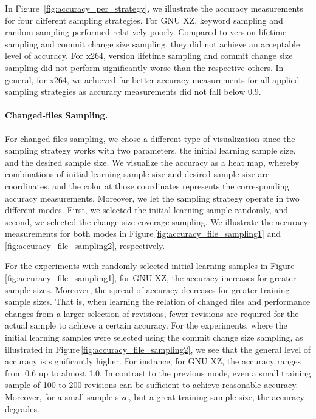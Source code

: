 In Figure~\ref{fig:accuracy_per_strategy}, we illustrate the accuracy
measurements for four different sampling strategies. For GNU XZ, keyword
sampling and random sampling performed relatively poorly. Compared to version
lifetime sampling and commit change size sampling, they did not achieve an
acceptable level of accuracy. For x264, version lifetime sampling and commit
change size sampling did not perform significantly worse than the respective
others. In general, for x264, we achieved far better accuracy measurements for
all applied sampling strategies as accuracy measurements did not fall below
0.9.

\paragraph{Changed-files Sampling.} For changed-files sampling, we chose a different type of visualization since the
sampling strategy works with two parameters, the initial learning sample size,
and the desired sample size. We visualize the accuracy as a heat map, whereby
combinations of initial learning sample size and desired sample size are
coordinates, and the color at those coordinates represents the corresponding
accuracy measurements. Moreover, we let the sampling strategy operate in two
different modes. First, we selected the initial learning sample randomly, and
second, we selected the change size coverage sampling. We illustrate the
accuracy measurements for both modes in
Figure\,\ref{fig:accuracy_file_sampling1}
and\,\ref{fig:accuracy_file_sampling2}, respectively.

For the experiments with randomly selected initial learning samples in
Figure\,\ref{fig:accuracy_file_sampling1},  for GNU XZ, the accuracy increases
for greater sample sizes.
Moreover, the spread of accuracy decreases for greater training sample sizes. That is,
when learning the relation of changed files and performance changes from a
larger selection of revisions, fewer revisions are required for the actual
sample to achieve a certain accuracy. For the experiments, where the initial
learning samples were selected using the commit change size sampling, as
illustrated in Figure\,\ref{fig:accuracy_file_sampling2}, we see that the
general level of accuracy is significantly higher. For instance, for GNU XZ, the accuracy ranges from 0.6 up
to almost 1.0. In contrast to the previous mode, even a small training sample
of 100 to 200 revisions can be sufficient to achieve reasonable accuracy.
Moreover, for a small sample size, but a great training sample size, the
accuracy degrades.

